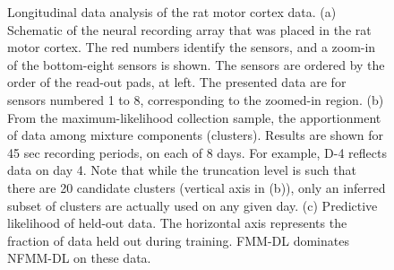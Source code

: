 \documentclass[journal]{IEEEtran}
\begin{document}
\begin{figure}[!htbp]
{ }
  \caption{{
{Longitudinal data analysis of the rat motor cortex data. }
(a) Schematic of the neural
recording array that was placed in the rat motor cortex. The red
numbers identify the sensors, and a zoom-in of the bottom-eight
sensors is shown. The sensors are ordered by the order of the
read-out pads, at left. The presented data are for sensors numbered 1 to 8, corresponding to the zoomed-in region. (b) From the maximum-likelihood collection
sample, the apportionment of data among mixture components
(clusters). Results are shown for 45 sec recording periods, on each
of 8 days. For example, D-4 reflects data on day 4. Note that while the truncation level is such that there are 20 candidate clusters (vertical axis in (b)), only an inferred subset of clusters are actually used on any given day. (c) Predictive likelihood of held-out data. The
horizontal axis represents the fraction of data held out during training. 
{FMM-DL dominates NFMM-DL on these data. }}} \label{fig:long} \vspace{-20pt}
\end{figure}
\end{document}
